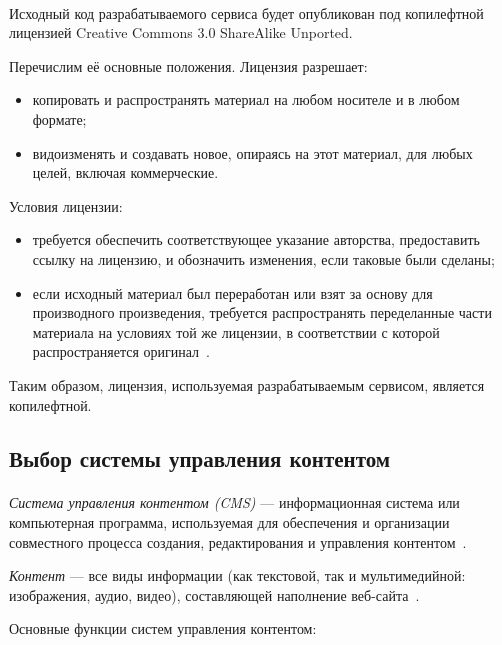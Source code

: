 \paragraph{}
Исходный код разрабатываемого сервиса будет опубликован под копилефтной лицензией 
Creative Commons 3.0 ShareAlike Unported.

Перечислим её основные положения. Лицензия разрешает:
\begin{itemize}
\item копировать и распространять материал на любом носителе и в любом формате;
\item видоизменять и создавать новое, опираясь на этот материал, для любых целей, включая коммерческие.
\end{itemize}

Условия лицензии:
\begin{itemize}
\item требуется обеспечить соответствующее указание авторства, предоставить ссылку на лицензию,
  и обозначить изменения, если таковые были сделаны;
\item если исходный материал был переработан или взят за основу для производного произведения,
  требуется распространять переделанные части материала на условиях той же лицензии, 
  в соответствии с которой распространяется оригинал~\cite{cc_by_sa}.
\end{itemize}

Таким образом, лицензия, используемая разрабатываемым сервисом, является копилефтной. 

\subsection{Выбор системы управления контентом}
\label{ssec:choice_cms}

\paragraph{}
\textit{Система управления контентом (CMS)} --- информационная система или компьютерная программа,
используемая для обеспечения и организации совместного процесса создания,
редактирования и управления контентом~\cite{wiki_cms}.

\textit{Контент} --- все виды информации (как текстовой, так и мультимедийной: изображения, аудио, видео),
составляющей наполнение веб-сайта~\cite{wiki_content}.

Основные функции систем управления контентом:

